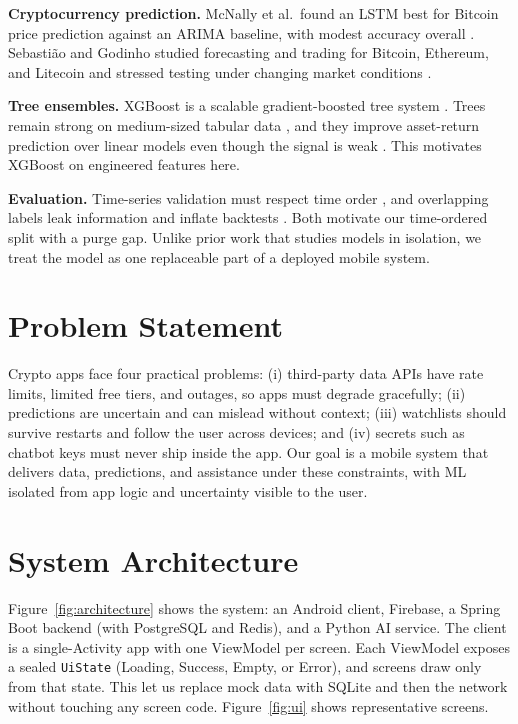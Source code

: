\documentclass[conference]{IEEEtran}
\begin{document}
\textbf{Cryptocurrency prediction.} McNally et al.\ found an LSTM best for Bitcoin price prediction against an ARIMA baseline, with modest accuracy overall \cite{mcnally2018}. Sebasti\~ao and Godinho studied forecasting and trading for Bitcoin, Ethereum, and Litecoin and stressed testing under changing market conditions \cite{sebastiao2021}.

\textbf{Tree ensembles.} XGBoost is a scalable gradient-boosted tree system \cite{chen2016}. Trees remain strong on medium-sized tabular data \cite{grinsztajn2022}, and they improve asset-return prediction over linear models even though the signal is weak \cite{gu2020}. This motivates XGBoost on engineered features here.

\textbf{Evaluation.} Time-series validation must respect time order \cite{bergmeir2012}, and overlapping labels leak information and inflate backtests \cite{lopez2018}. Both motivate our time-ordered split with a purge gap. Unlike prior work that studies models in isolation, we treat the model as one replaceable part of a deployed mobile system.

\section{Problem Statement}
Crypto apps face four practical problems: (i) third-party data APIs have rate limits, limited free tiers, and outages, so apps must degrade gracefully; (ii) predictions are uncertain and can mislead without context; (iii) watchlists should survive restarts and follow the user across devices; and (iv) secrets such as chatbot keys must never ship inside the app. Our goal is a mobile system that delivers data, predictions, and assistance under these constraints, with ML isolated from app logic and uncertainty visible to the user.

\section{System Architecture}
Figure~\ref{fig:architecture} shows the system: an Android client, Firebase, a Spring Boot backend (with PostgreSQL and Redis), and a Python AI service. The client is a single-Activity app with one ViewModel per screen. Each ViewModel exposes a sealed \texttt{UiState} (Loading, Success, Empty, or Error), and screens draw only from that state. This let us replace mock data with SQLite and then the network without touching any screen code. Figure~\ref{fig:ui} shows representative screens.
\end{document}
